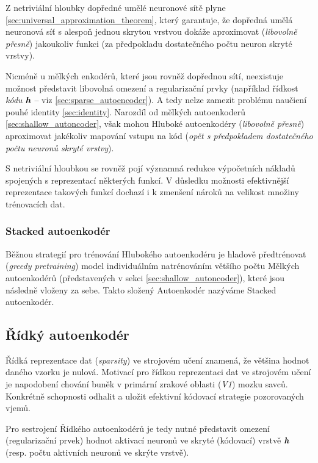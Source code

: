 Z netriviální hloubky dopředné umělé neuronové sítě plyne \autoref{sec:universal_approximation_theorem},
který garantuje, že dopředná umělá neuronová síť s alespoň jednou skrytou vrstvou dokáže aproximovat (\emph{libovolně přesně}) jakoukoliv funkci (za předpokladu dostatečného počtu neuron skryté vrstvy).

Nicméně u mělkých enkodérů, které jsou rovněž dopřednou sítí, neexistuje možnost představit libovolná omezení a regularizační prvky (například řídkost \emph{kódu} $\textbf{\emph{h}}$ – viz \autoref{sec:sparse_autoencoder}).
A tedy nelze zamezit problému naučiení pouhé identity \autoref{sec:identity}. Narozdíl od mělkých autoenkoderů \autoref{sec:shallow_autoncoder},
však mohou Hluboké autoenkodéry (\emph{libovolně přesně}) aproximovat jakékoliv mapování vstupu na kód (\emph{opět s předpokladem dostatečného počtu neuronů skryté vrstvy}).

S netriviální hloubkou se rovněž pojí významná redukce výpočetních nákladů spojených s reprezentací některých funkcí. 
V důsledku možnosti efektivnější reprezentace takových funkcí dochazí i k zmenšení nároků na velikost množiny trénovacích dat.


\subsubsection{Stacked autoenkodér}
Běžnou strategií pro trénování Hlubokého autoenkodéru je hladově předtrénovat (\emph{greedy pretraining}) model individuálním natrénováním většího počtu Mělkých autoenkodérů (představených v sekci \autoref{sec:shallow_autoncoder}), které jsou následně vloženy za sebe.
Takto složený Autoenkodér nazýváme Stacked autoenkodér.



\subsection{Řídký autoenkodér}
\label{sec:sparse_autoencoder}
Řídká reprezentace dat (\emph{sparsity}) ve strojovém učení znamená, že většina hodnot daného vzorku je nulová. 
Motivací pro řídkou reprezentaci dat ve strojovém učení je napodobení chování buněk v primární zrakové oblasti (\emph{V1}) mozku savců.
Konkrétně schopnosti odhalit a uložit efektivní kódovací strategie pozorovaných vjemů. 

Pro sestrojení Řídkého autoenkodérů je tedy nutné představit omezení (regularizační prvek) hodnot aktivací neuronů ve skryté (kódovací) vrstvě $\textbf{\emph{h}}$ (resp. počtu aktivních neuronů ve skrýte vrstvě).

